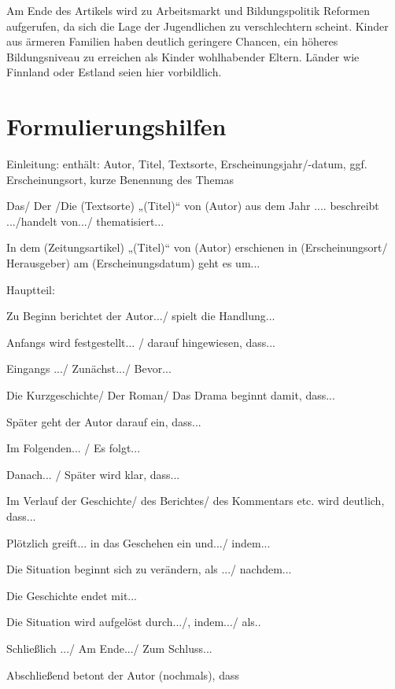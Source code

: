 Am Ende des Artikels wird zu Arbeitsmarkt und Bildungspolitik Reformen aufgerufen, da sich die Lage der Jugendlichen zu verschlechtern scheint. Kinder aus ärmeren Familien haben deutlich geringere Chancen, ein höheres Bildungsniveau zu erreichen als Kinder wohlhabender Eltern. Länder wie Finnland oder Estland seien hier vorbildlich. 

\newpage


\section{Formulierungshilfen}

Einleitung:
enthält: Autor, Titel, Textsorte, Erscheinungsjahr/-datum, ggf. Erscheinungsort, kurze Benennung des Themas 
\begin{compactitem}
    \item Das/ Der /Die (Textsorte) „(Titel)“ von (Autor) aus dem Jahr .... beschreibt .../handelt von.../ thematisiert...  
    \item In dem (Zeitungsartikel) „(Titel)“ von (Autor) erschienen in (Erscheinungsort/ Herausgeber) am (Erscheinungsdatum) geht es um... 
\end{compactitem}
Hauptteil: 
\begin{compactitem}
    \item  Zu Beginn berichtet der Autor.../ spielt die Handlung... 
    \item  Anfangs wird festgestellt... / darauf hingewiesen, dass...
    \item  Eingangs .../ Zunächst.../ Bevor...
    \item Die Kurzgeschichte/ Der Roman/ Das Drama beginnt damit, dass... 
    \item Später geht der Autor darauf ein, dass... 
    \item  Im Folgenden... / Es folgt...
    \item Danach... / Später wird klar, dass...
    \item Im Verlauf der Geschichte/ des Berichtes/ des Kommentars etc. wird deutlich, dass...
    \item Plötzlich greift... in das Geschehen ein und.../ indem...
    \item  Die Situation beginnt sich zu verändern, als .../ nachdem... 
    \item Die Geschichte endet mit...
    \item Die Situation wird aufgelöst durch.../, indem.../ als..
    \item Schließlich .../ Am Ende.../ Zum Schluss... 
    \item Abschließend betont der Autor (nochmals), dass 
\end{compactitem}

